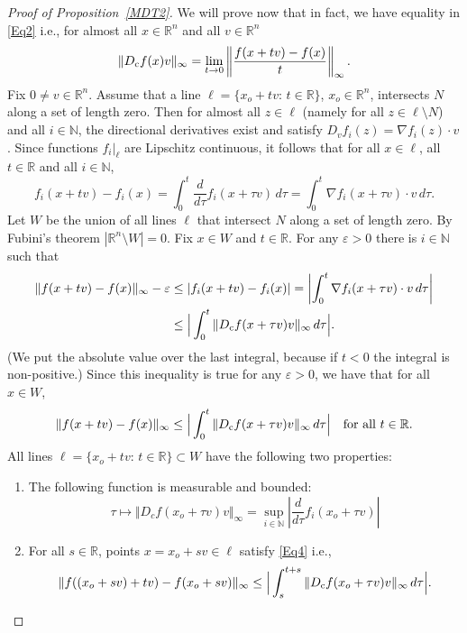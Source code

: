 \documentclass[12pt,leqno]{amsart}
\theoremstyle{definition}
\newcommand{\bbbn}{\mathbb N}
\newcommand{\bbbr}{\mathbb R}
\newcommand{\eps}{\varepsilon}
\numberwithin{theorem}{section} \numberwithin{equation}{section}
\begin{document}
\begin{proof}[Proof of Proposition~\ref{MDT2}]
We will prove now that in fact, we have equality in \eqref{Eq2} i.e., for almost all $x\in\bbbr^n$ and all $v\in\bbbr^n$
$$
\Vert D_{\rm c}f(x)v\Vert_\infty = \lim_{t\to 0}\left\Vert \frac{f(x+tv)-f(x)}{t}\right\Vert_\infty.
$$
Fix $0\neq v\in\bbbr^n$. Assume that a line $\ell=\{x_o+tv:\, t\in\bbbr\}$, $x_o\in\bbbr^n$, intersects $N$ along a set of length zero. Then for almost all $z\in\ell$ (namely for all $z\in \ell\setminus N$) and all $i\in\bbbn$,
the directional derivatives exist and satisfy $D_vf_i(z)=\nabla f_i(z)\cdot v$. Since functions $f_i|_\ell$ are Lipschitz continuous, it follows that for all $x\in \ell$, all $t\in\bbbr$ and all $i\in\bbbn$,
$$
f_i(x+tv)-f_i(x)=
\int_0^t \frac{d}{d\tau} f_i(x+\tau v)\, d\tau=
\int_0^t\nabla f_i(x+\tau v)\cdot v\, d\tau.
$$
Let $W$ be the union of all lines $\ell$ that intersect $N$ along a set of length zero. By Fubini's theorem $|\bbbr^n\setminus W|=0$. Fix $x\in W$ and $t\in\bbbr$.
For any $\eps>0$
there is $i\in\bbbn$ such that
\begin{equation*}
\begin{split}
\Vert f(x+tv)-f(x)\Vert_\infty-\eps
&\leq
|f_i(x+tv)-f_i(x)|=\left|\int_0^t \nabla f_i(x+\tau v)\cdot v\, d\tau\right|\\
&\leq
\Big|\int_0^t \Vert D_{\rm c}f(x+\tau v)v\Vert_\infty\, d\tau\Big|.
\end{split}
\end{equation*}
(We put the absolute value over the last integral, because if $t<0$ the integral is non-positive.)
Since this inequality is true for any $\eps>0$, we have that for all $x\in W$,
\begin{equation}
\label{Eq4}
\Vert f(x+tv)-f(x)\Vert_\infty \leq \Big|\int_0^t \Vert D_{\rm c}f(x+\tau v)v\Vert_\infty\, d\tau\Big|
\quad
\text{for all $t\in\bbbr$.}
\end{equation}
All lines $\ell=\{x_o+tv:\, t\in\bbbr\}\subset W$ have the following two properties:
\begin{enumerate}
\item[(a)] The following function is measurable and bounded:
$$
\tau\mapsto\Vert D_cf(x_o+\tau v)v\Vert_\infty =\sup_{i\in\bbbn}\left|\frac{d}{d\tau}f_i(x_o+\tau v)\right|
$$
\item[(b)] For all $s\in\bbbr$, points $x=x_o+sv\in \ell$ satisfy \eqref{Eq4} i.e.,
$$
\Vert f((x_o+sv)+tv)-f(x_o+sv)\Vert_\infty\leq
\Big|\int_s^{t+s}\Vert D_{\rm c}f(x_o+\tau v)v\Vert_\infty\, d\tau\Big|.
$$
\end{enumerate}
\end{proof}
\end{document}
